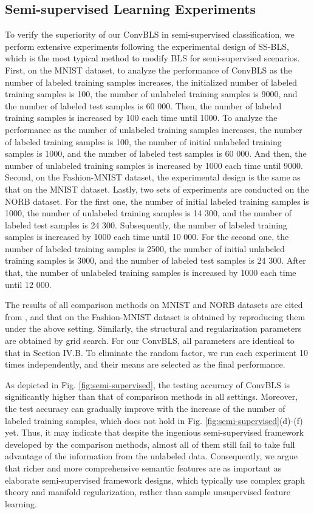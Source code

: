 \documentclass[lettersize,journal]{IEEEtran}
\begin{document}
\subsection{Semi-supervised Learning Experiments}
To verify the superiority of our ConvBLS in semi-supervised classification, we perform extensive experiments following the experimental design of SS-BLS\cite{zhao2020semi}, which is the most typical method to modify BLS for semi-supervised scenarios. First, on the MNIST dataset, to analyze the performance of ConvBLS as the number of labeled training samples increases, the initialized number of labeled training samples is 100, the number of unlabeled training samples is 9000, and the number of labeled test samples is 60 000. Then, the number of labeled training samples is increased by 100 each time until 1000. To analyze the performance as the number of unlabeled training samples increases, the number of labeled training samples is 100, the number of initial unlabeled training samples is 1000, and the number of labeled test samples is 60 000. And then, the number of unlabeled training samples is increased by 1000 each time until 9000. Second, on the Fashion-MNIST dataset, the experimental design is the same as that on the MNIST dataset. Lastly, two sets of experiments are conducted on the NORB dataset. For the first one, the number of initial labeled training samples is 1000, the number of unlabeled training samples is 14 300, and the number of labeled test samples is 24 300. Subsequently, the number of labeled training samples is increased by 1000 each time until 10 000. For the second one, the number of labeled training samples is 2500, the number of initial unlabeled training samples is 3000, and the number of labeled test samples is 24 300. After that, the number of unlabeled training samples is increased by 1000 each time until 12 000. 

The results of all comparison methods on MNIST and NORB datasets are cited from \cite{zhao2020semi}, and that on the Fashion-MNIST dataset is obtained by reproducing them under the above setting. Similarly, the structural and regularization parameters are obtained by grid search. For our ConvBLS, all parameters are identical to that in Section IV.B. To eliminate the random factor, we run each experiment 10 times independently, and their means are selected as the final performance.

As depicted in Fig. \ref{fig:semi-supervised}, the testing accuracy of ConvBLS is significantly higher than that of comparison methods in all settings. Moreover, the test accuracy can gradually improve with the increase of the number of labeled training samples, which does not hold in Fig. \ref{fig:semi-supervised}(d)-(f) yet. Thus, it may indicate that despite the ingenious semi-supervised framework developed by the comparison methods, almost all of them still fail to take full advantage of the information from the unlabeled data. Consequently, we argue that richer and more 
comprehensive semantic features are as important as elaborate semi-supervised framework designs, which typically use complex graph theory and manifold regularization, rather than sample unsupervised feature learning.
\end{document}
